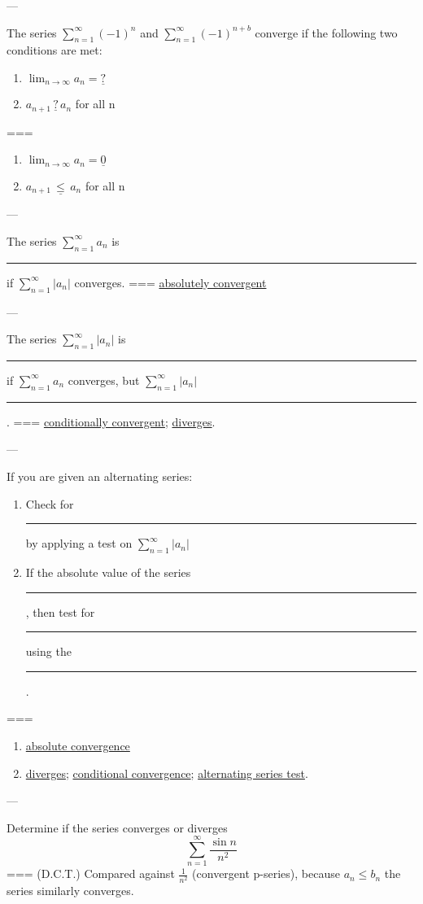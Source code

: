 ---


The series \(\sum_{n=1}^\infty {(-1)}^{n}\) and \(\sum_{n=1}^\infty
{(-1)}^{n+b}\) converge if the following two conditions are met:
\begin{enumerate}
  \item \(\lim_{n\to\infty} a_n=\underline{?}\)
  \item \(a_{n+1}\,\underline{?}\,a_n\) for all n
\end{enumerate}
===
\begin{enumerate}
  \item \(\lim_{n\to\infty} a_n=\underline{0}\)
  \item \(a_{n+1}\,\underline{\leq}\,a_n\) for all n
\end{enumerate}

---


The series \(\sum_{n=1}^\infty a_n\) is \rule{1cm}{0.15mm} if
\(\sum_{n=1}^\infty |a_n|\) converges.
===
\underline{absolutely convergent}

---

The series \(\sum_{n=1}^\infty |a_n|\) is \rule{1cm}{0.15mm} if
\(\sum_{n=1}^\infty a_n\) converges, but \(\sum_{n=1}^\infty |a_n|\)
\rule{1cm}{0.15mm}.
===
\underline{conditionally convergent}; \underline{diverges}.

---

If you are given an alternating series:
\begin{enumerate}
  \item Check for \rule{1cm}{0.15mm} by applying a test on \(\sum_{n=1}^\infty
    |a_n|\)
  \item If the absolute value of the series \rule{1cm}{0.15mm}, then test for
    \rule{1cm}{0.15mm} using the \rule{1cm}{0.15mm}.
\end{enumerate}
===
\begin{enumerate}
  \item \underline{absolute convergence}
  \item \underline{diverges}; \underline{conditional convergence};
    \underline{alternating series test}.
\end{enumerate}

---

Determine if the series converges or diverges
\[\sum_{n=1}^\infty \frac{\sin n}{n^2}\]
===
(D.C.T.) Compared against \(\frac{1}{n^2}\) (convergent p-series), because
\(a_n\leq b_n\) the series similarly converges.

